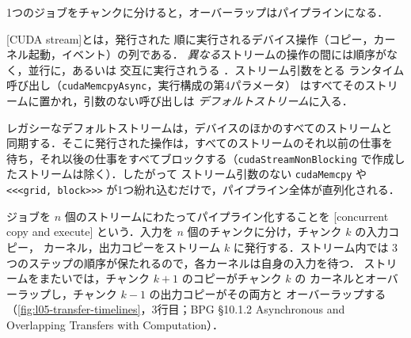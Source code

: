 \documentclass[../main.tex]{subfiles}
\begin{document}
1つのジョブをチャンクに分けると，オーバーラップはパイプラインになる．

\begin{definition}
  [CUDA stream]とは，発行された
  順に実行されるデバイス操作（コピー，カーネル起動，イベント）の列である．
  \emph{異なる}ストリームの操作の間には順序がなく，並行に，あるいは
  交互に実行されうる \cite{harris2015streams}．ストリーム引数をとる
  ランタイム呼び出し（\texttt{cudaMemcpyAsync}，実行構成の第4パラメータ）
  はすべてそのストリームに置かれ，引数のない呼び出しは
  \emph{デフォルトストリーム}に入る．
\end{definition}

レガシーなデフォルトストリームは，デバイスのほかのすべてのストリームと
同期する．そこに発行された操作は，すべてのストリームのそれ以前の仕事を
待ち，それ以後の仕事をすべてブロックする（\texttt{cudaStreamNonBlocking}
で作成したストリームは除く）\cite{harris2015streams}．したがって
ストリーム引数のない \texttt{cudaMemcpy} や \texttt{<<<grid, block>>>}
が1つ紛れ込むだけで，パイプライン全体が直列化される．

\begin{definition}[コピーと実行の並行処理]
  ジョブを $n$ 個のストリームにわたってパイプライン化することを
  [concurrent copy and execute]
  という．入力を $n$ 個のチャンクに分け，チャンク $k$ の入力コピー，
  カーネル，出力コピーをストリーム $k$ に発行する．ストリーム内では
  3つのステップの順序が保たれるので，各カーネルは自身の入力を待つ．
  ストリームをまたいでは，チャンク $k+1$ のコピーがチャンク $k$ の
  カーネルとオーバーラップし，チャンク $k-1$ の出力コピーがその両方と
  オーバーラップする（\cref{fig:l05-transfer-timelines}，3行目；BPG
  §10.1.2 Asynchronous and Overlapping Transfers with Computation）．
\end{definition}
\end{document}
